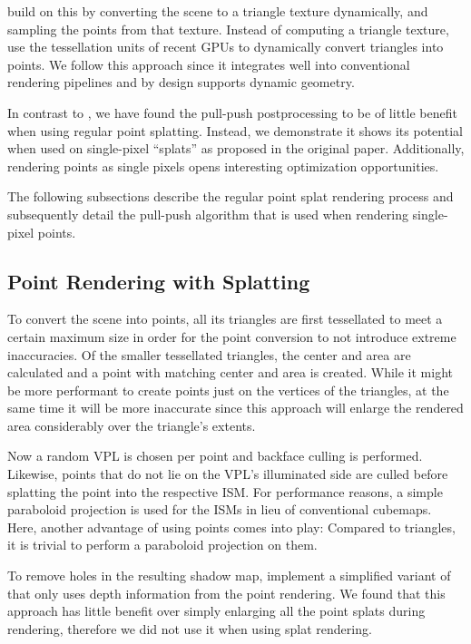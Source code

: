 \citet{ritschel2011ismsViewAdaptive} build on this by converting the scene to a triangle texture dynamically, and sampling the points from that texture. Instead of computing a triangle texture, \citet{barak2013temporally} use the tessellation units of recent GPUs to dynamically convert triangles into points.
We follow this approach since it integrates well into conventional rendering pipelines and by design supports dynamic geometry.

In contrast to \citet{ritschel2008ism}, we have found the pull-push postprocessing to be of little benefit when using regular point splatting. Instead, we demonstrate it shows its potential when used on single-pixel ``splats'' as proposed in the original paper. Additionally, rendering points as single pixels opens interesting optimization opportunities.

The following subsections describe the regular point splat rendering process and subsequently detail the pull-push algorithm that is used when rendering single-pixel points.


\subsection{Point Rendering with Splatting}

To convert the scene into points, all its triangles are first tessellated to meet a certain maximum size in order for the point conversion to not introduce extreme inaccuracies. Of the smaller tessellated triangles, the center and area are calculated and a point with matching center and area is created. While it might be more performant to create points just on the vertices of the triangles, at the same time it will be more inaccurate since this approach will enlarge the rendered area considerably over the triangle's extents.

Now a random VPL is chosen per point and backface culling is performed. Likewise, points that do not lie on the VPL's illuminated side are culled before splatting the point into the respective ISM. For performance reasons, a simple paraboloid projection is used for the ISMs in lieu of conventional cubemaps. Here, another advantage of using points comes into play: Compared to triangles, it is trivial to perform a paraboloid projection on them.

To remove holes in the resulting shadow map, \citet{ritschel2008ism} implement a simplified variant of \citet{Marroquim:2007:reconstruction} that only uses depth information from the point rendering. We found that this approach has little benefit over simply enlarging all the point splats during rendering, therefore we did not use it when using splat rendering.



